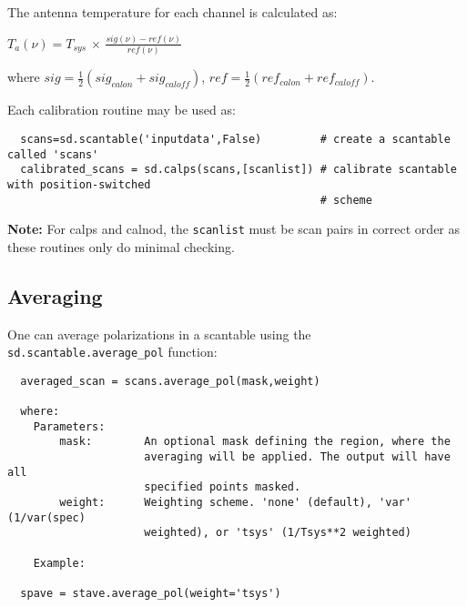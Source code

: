 The antenna temperature for each channel is calculated as:

$ T_a(\nu) = T_{sys}$ $\times$ 
$\frac{sig(\nu) - ref(\nu)}{ref(\nu)}$

where $sig = \frac{1}{2}(sig_{calon} + sig_{caloff})$, 
      $ref = \frac{1}{2}(ref_{calon} + ref_{caloff}).$


Each calibration routine may be used as:


\small
\begin{verbatim}
  scans=sd.scantable('inputdata',False)         # create a scantable called 'scans'
  calibrated_scans = sd.calps(scans,[scanlist]) # calibrate scantable with position-switched 
                                                # scheme
\end{verbatim}
\normalsize


{\bf Note:} For calps and calnod, the {\tt scanlist} must be scan pairs in
correct order as these routines only do minimal checking.

\subsection{Averaging}
\label{subsubsection:sd.asap.averaging}

One can average polarizations in a scantable using the
{\tt sd.scantable.average\_pol} function:
\small
\begin{verbatim}
  averaged_scan = scans.average_pol(mask,weight)

  where:
    Parameters:
        mask:        An optional mask defining the region, where the
                     averaging will be applied. The output will have all
                     specified points masked.
        weight:      Weighting scheme. 'none' (default), 'var' (1/var(spec)
                     weighted), or 'tsys' (1/Tsys**2 weighted)

    Example:

  spave = stave.average_pol(weight='tsys')
\end{verbatim}
\normalsize

